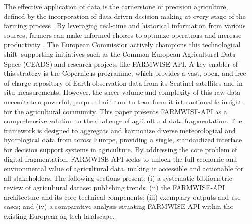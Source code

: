 \documentclass[preprint,12pt,authoryear]{elsarticle}
\begin{document}
The effective application of data is the cornerstone of precision agriculture, defined by the incorporation of data-driven decision-making at every stage of the farming process \citep{Gebbers2010}. By leveraging real-time and historical information from various sources, farmers can make informed choices to optimize operations and increase productivity \citep{EUComistion25, Latruffe2014}. The European Commission actively champions this technological shift, supporting initiatives such as the Common European Agricultural Data Space (CEADS) and research projects like FARMWISE-API. A key enabler of this strategy is the Copernicus programme, which provides a vast, open, and free-of-charge repository of Earth observation data from its Sentinel satellites and in-situ measurements. However, the sheer volume and complexity of this raw data necessitate a powerful, purpose-built tool to transform it into actionable insights for the agricultural community.
This paper presents FARMWISE-API as a comprehensive solution to the challenge of agricultural data fragmentation. The framework is designed to aggregate and harmonize diverse meteorological and hydrological data from across Europe, providing a single, standardized interface for decision support systems in agriculture. By addressing the core problem of digital fragmentation, FARMWISE-API seeks to unlock the full economic and environmental value of agricultural data, making it accessible and actionable for all stakeholders. The following sections present: (i) a systematic bibliometric review of agricultural dataset publishing trends; (ii) the FARMWISE-API architecture and its core technical components; (iii) exemplary outputs and use cases; and (iv) a comparative analysis situating FARMWISE-API within the existing European ag-tech landscape.


\end{document}
